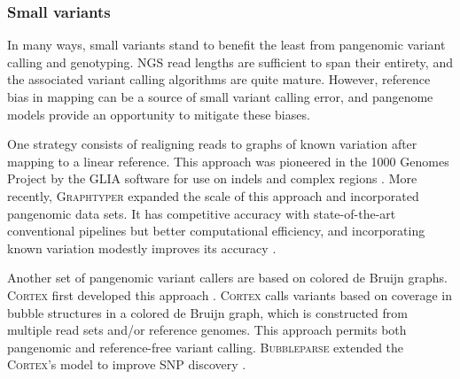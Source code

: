 \subsubsection{Small variants}

In many ways, small variants stand to benefit the least from pangenomic variant calling and genotyping.
NGS read lengths are sufficient to span their entirety, and the associated variant calling algorithms are quite mature.
However, reference bias in mapping can be a source of small variant calling error, and pangenome models provide an opportunity to mitigate these biases.

One strategy consists of realigning reads to graphs of known variation after mapping to a linear reference.
This approach was pioneered in the 1000 Genomes Project by the \textsc{GLIA} software for use on indels and complex regions \cite{1000_2015}.
More recently, \textsc{Graphtyper} expanded the scale of this approach and incorporated pangenomic data sets.
It has competitive accuracy with state-of-the-art conventional pipelines but better computational efficiency, and incorporating known variation modestly improves its accuracy \cite{eggertsson2017graphtyper}.

Another set of pangenomic variant callers are based on colored de Bruijn graphs.
\textsc{Cortex} first developed this approach \cite{Iqbal_2012}.
\textsc{Cortex} calls variants based on coverage in bubble structures in a colored de Bruijn graph, which is constructed from multiple read sets and/or reference genomes.
This approach permits both pangenomic and reference-free variant calling.
\textsc{Bubbleparse} extended the \textsc{Cortex}'s model to improve SNP discovery \cite{Leggett_2013}.


